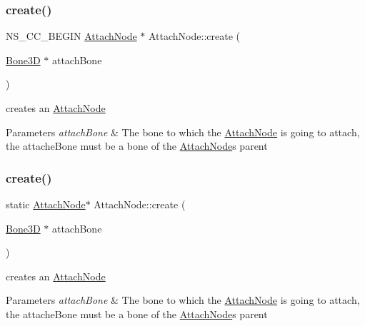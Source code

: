 \subsubsection{\texorpdfstring{create()}{create()}\hspace{0.1cm}{\footnotesize\ttfamily [1/2]}}
{\footnotesize\ttfamily N\+S\+\_\+\+C\+C\+\_\+\+B\+E\+G\+IN \hyperlink{classAttachNode}{Attach\+Node} $\ast$ Attach\+Node\+::create (\begin{DoxyParamCaption}\item[{\hyperlink{classBone3D}{Bone3D} $\ast$}]{attach\+Bone }\end{DoxyParamCaption})\hspace{0.3cm}{\ttfamily [static]}}

creates an \hyperlink{classAttachNode}{Attach\+Node} 
\begin{DoxyParams}{Parameters}
{\em attach\+Bone} & The bone to which the \hyperlink{classAttachNode}{Attach\+Node} is going to attach, the attache\+Bone must be a bone of the \hyperlink{classAttachNode}{Attach\+Node}\textquotesingle{}s parent \\
\hline
\end{DoxyParams}
\mbox{\label{classAttachNode_ab3e6006a938a97f1d3b8f1e531c3da50}} 
\subsubsection{\texorpdfstring{create()}{create()}\hspace{0.1cm}{\footnotesize\ttfamily [2/2]}}
{\footnotesize\ttfamily static \hyperlink{classAttachNode}{Attach\+Node}$\ast$ Attach\+Node\+::create (\begin{DoxyParamCaption}\item[{\hyperlink{classBone3D}{Bone3D} $\ast$}]{attach\+Bone }\end{DoxyParamCaption})\hspace{0.3cm}{\ttfamily [static]}}

creates an \hyperlink{classAttachNode}{Attach\+Node} 
\begin{DoxyParams}{Parameters}
{\em attach\+Bone} & The bone to which the \hyperlink{classAttachNode}{Attach\+Node} is going to attach, the attache\+Bone must be a bone of the \hyperlink{classAttachNode}{Attach\+Node}\textquotesingle{}s parent \\
\hline
\end{DoxyParams}
\mbox{\label{classAttachNode_acff1e6467b97ca416e45af09c28028d6}} 
